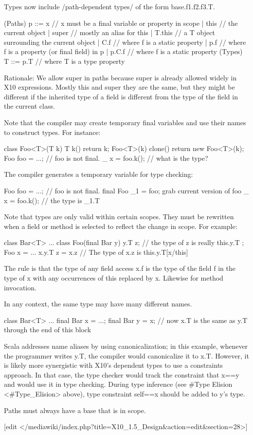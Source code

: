 

Types now include /path-dependent types/ of the form base.f1.f2.f3.T.

(Paths) p ::= x         // x must be a final variable or property in scope
           |  this      // the current object
           |  super     // mostly an alias for this
           |  T.this    // a T object surrounding the current object
           |  C.f       // where f is a static property
           |  p.f       // where f is a property (or final field) in p
           |  p.C.f     // where f is a static property
(Types) T ::= p.T       // where T is a type property

Rationale: We allow super in paths because super is already allowed
widely in X10 expressions. Mostly this and super they are the same, but
they might be different if the inherited type of a field is different
from the type of the field in the current class.

Note that the compiler may create temporary final variables and use
their names to construct types. For instance:

class Foo<T>(T k) { 
  T k() {
    return k;
  }
  Foo<T>(k) clone() {
    return new Foo<T>(k);
  }
}
Foo foo = ...; // foo is not final. 
_ x = foo.k(); // what is the type?

The compiler generates a temporary variable for type checking:

Foo foo = ...; // foo is not final. 
final Foo _1 = foo;  grab current version of foo
_ x = foo.k();  // the type is _1.T

Note that types are only valid within certain scopes. They must be
rewritten when a field or method is selected to reflect the change in
scope. For example:

class Bar<T> {...}
class Foo(final Bar y) { 
  y.T z;  // the type of z is really this.y.T
};
Foo x = ...
x.y.T z = x.z   // The type of x.z is this.y.T[x/this] 

The rule is that the type of any field access x.f is the type of the
field f in the type of x with any occurrences of this replaced by x.
Likewise for method invocation.


In any context, the same type may have many different names.

class Bar<T> {...}
final Bar x = ...;
final Bar y = x;  
// now x.T is the same as y.T through the end of this block

Scala addresses name aliases by using canonicalization; in this example,
whenever the programmer writes y.T, the compiler would canonicalize it
to x.T. However, it is likely more synergistic with X10's dependent
types to use a constraints approach. In that case, the type checker
would track the constraint that x==y and would use it in type checking.
During type inference (see #Type Elision <#Type_Elision> above), type
constraint self==x should be added to y's type.

Paths must always have a base that is in scope.

[edit </mediawiki/index.php?title=X10_1.5_Design&action=edit&section=28>]


